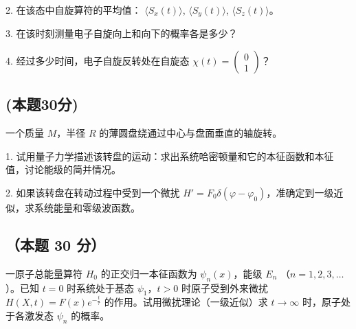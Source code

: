 2. 在该态中自旋算符的平均值： $\langle S_x(t) \rangle$, $\langle S_y(t) \rangle$, $\langle S_z(t) \rangle$。

3. 在该时刻测量电子自旋向上和向下的概率各是多少？

4. 经过多少时间，电子自旋反转处在自旋态 $\chi(t) = \begin{pmatrix} 0 \\ 1 \end{pmatrix}$？

\subsection{(本题30分)}
一个质量 $M$，半径 $R$ 的薄圆盘绕通过中心与盘面垂直的轴旋转。

1. 试用量子力学描述该转盘的运动：求出系统哈密顿量和它的本征函数和本征值，讨论能级的简并情况。

2. 如果该转盘在转动过程中受到一个微扰 $H' = F_0 \delta(\varphi - \varphi_0)$，准确定到一级近似，求系统能量和零级波函数。

\subsection{（本题 30 分）}
一原子总能量算符 $H_0$ 的正交归一本征函数为 $\psi_n(x)$，能级 $E_n$ （$n = 1, 2, 3, \ldots$）。已知 $t = 0$ 时系统处于基态 $\psi_1$，$t > 0$ 时原子受到外来微扰 $H(X,t) = F(x) e^{-\frac{t}{\tau}}$ 的作用。试用微扰理论（一级近似）求 $t \rightarrow \infty$ 时，原子处于各激发态 $ \psi_n $ 的概率。